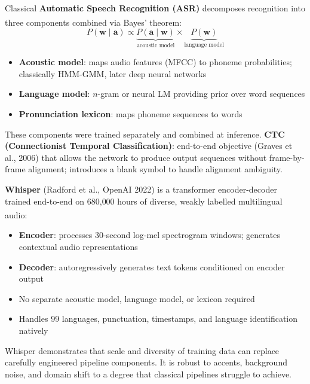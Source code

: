 \begin{tcbitemize}[ skin=sectionraster ]
    \tcbitem[title={Classical ASR Pipeline}, raster multicolumn=3]
    Classical \textbf{Automatic Speech Recognition (ASR)} decomposes recognition into three components combined via Bayes' theorem\textsuperscript{\cite[][p.~11]{dhamaniIntroductionGenerativeAI2024}}:
    \begin{equation}
        P(\mathbf{w} \mid \mathbf{a}) \propto \underbrace{P(\mathbf{a} \mid \mathbf{w})}_{\text{acoustic model}} \times \underbrace{P(\mathbf{w})}_{\text{language model}}
    \end{equation}
    \begin{itemize}
        \item \textbf{Acoustic model}: maps audio features (MFCC) to phoneme probabilities; classically HMM-GMM, later deep neural networks
        \item \textbf{Language model}: $n$-gram or neural LM providing prior over word sequences
        \item \textbf{Pronunciation lexicon}: maps phoneme sequences to words
    \end{itemize}
    These components were trained separately and combined at inference.
    \textbf{CTC (Connectionist Temporal Classification)}: end-to-end objective (Graves et al., 2006) that allows the network to produce output sequences without frame-by-frame alignment; introduces a blank symbol to handle alignment ambiguity.

    \tcbitem[title={End-to-End ASR: Whisper}, raster multicolumn=3]
    \textbf{Whisper} (Radford et al., OpenAI 2022) is a transformer encoder-decoder trained end-to-end on 680{,}000 hours of diverse, weakly labelled multilingual audio\textsuperscript{\cite[][p.~11]{dhamaniIntroductionGenerativeAI2024}}:
    \begin{itemize}
        \item \textbf{Encoder}: processes 30-second log-mel spectrogram windows; generates contextual audio representations
        \item \textbf{Decoder}: autoregressively generates text tokens conditioned on encoder output
        \item No separate acoustic model, language model, or lexicon required
        \item Handles 99 languages, punctuation, timestamps, and language identification natively
    \end{itemize}
    Whisper demonstrates that scale and diversity of training data can replace carefully engineered pipeline components.
    It is robust to accents, background noise, and domain shift to a degree that classical pipelines struggle to achieve.
\end{tcbitemize}

